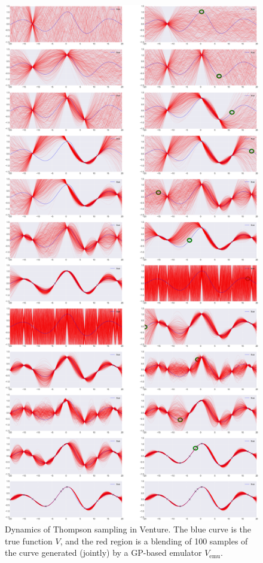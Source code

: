 \documentclass{article} %
\newcommand{\emu}{{\textrm{emu}}}
\begin{document}
\begin{figure}
\centering
    \includegraphics[height=0.8\textheight]{figs/BayesOpt_gpmem_sequence.png}
    \caption{
      Dynamics of Thompson sampling in Venture.
      The blue curve is the true function $V$, and the red region is a blending of 100 samples of the curve generated (jointly) by a GP-based emulator $V_\emu$.
}
\end{figure}
\end{document}
